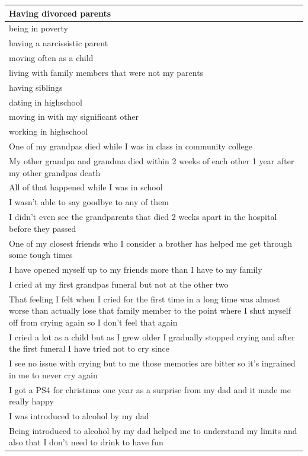 \documentclass[
  .7em,
  letterpaper,
  DIV=11,
  numbers=noendperiod]{scrartcl}
\begin{document}
\begin{table}
\begin{tabular}{l}
\hline
Having divorced parents\\
\hline
being in poverty\\
\hline
having a narcissistic parent\\
\hline
moving often as a child\\
\hline
living with family members that were not my parents\\
\hline
having siblings\\
\hline
dating in highschool\\
\hline
moving in with my significant other\\
\hline
working in highschool\\
\hline
One of my grandpas died while I was in class in community college\\
\hline
My other grandpa and grandma died within 2 weeks of each other 1 year after my other grandpas death\\
\hline
All of that happened while I was in school\\
\hline
I wasn't able to say goodbye to any of them\\
\hline
I didn't even see the grandparents that died 2 weeks apart in the hospital before they passed\\
\hline
One of my closest friends who I consider a brother has helped me get through some tough times\\
\hline
I have opened myself up to my friends more than I have to my family\\
\hline
I cried at my first grandpas funeral but not at the other two\\
\hline
That feeling I felt when I cried for the first time in a long time was almost worse than actually lose that family member to the point where I shut myself off from crying again so I don't feel that again\\
\hline
I cried a lot as a child but as I grew older I gradually stopped crying and after the first funeral I have tried not to cry since\\
\hline
I see no issue with crying but to me those memories are bitter so it's ingrained in me to never cry again\\
\hline
I got a PS4 for christmas one year as a surprise from my dad and it made me really happy\\
\hline
I was introduced to alcohol by my dad\\
\hline
Being introduced to alcohol by my dad helped me to understand my limits and also that I don't need to drink to have fun\\

\end{tabular}
\end{table}
\end{document}
